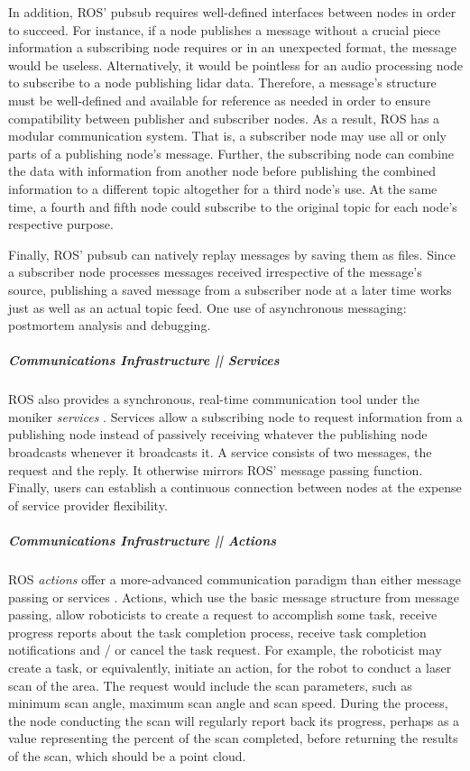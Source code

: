 \documentclass[9pt,twocolumn,twoside]{../../styles/osajnl}
\begin{document}
In addition, ROS' pubsub requires well-defined interfaces between nodes in order to succeed.  For instance, if a node publishes a message without a crucial piece information a subscribing node requires or in an unexpected format, the message would be useless.  Alternatively, it would be pointless for an audio processing node to subscribe to a node publishing lidar data.  Therefore, a message's structure must be well-defined and available for reference as needed in order to ensure compatibility between publisher and subscriber nodes.  As a result, ROS has a modular communication system.  That is, a subscriber node may use all or only parts of a publishing node's message.  Further, the subscribing node can combine the data with information from another node before publishing the combined information to a different topic altogether for a third node's use.  At the same time, a fourth and fifth node could subscribe to the original topic for each node's respective purpose.  

Finally, ROS' pubsub can natively replay messages by saving them as files.  Since a subscriber node processes messages received irrespective of the message's source, publishing a saved message from a subscriber node at a later time works just as well as an actual topic feed.  One use of asynchronous messaging: postmortem analysis and debugging.

\subparagraph{Communications Infrastructure || Services}
ROS also provides a synchronous, real-time communication tool under the moniker \textit{services} \cite{www-ros-services}. Services allow a subscribing node to request information from a publishing node instead of passively receiving whatever the publishing node broadcasts whenever it broadcasts it.  A service consists of two messages, the request and the reply.  It otherwise mirrors ROS' message passing function.  Finally, users can establish a continuous connection between nodes at the expense of service provider flexibility.

\subparagraph{Communications Infrastructure || Actions}
ROS \textit{actions} offer a more-advanced communication paradigm than either message passing or services \cite{www-ros-actionlib}.  Actions, which use the basic message structure from message passing, allow roboticists to create a request to accomplish some task, receive progress reports about the task completion process, receive task completion notifications and / or cancel the task request.  For example, the roboticist may create a task, or equivalently, initiate an action, for the robot to conduct a laser scan of the area.  The request would include the scan parameters, such as minimum scan angle, maximum scan angle and scan speed.  During the process, the node conducting the scan will regularly report back its progress, perhaps as a value representing the percent of the scan completed, before returning the results of the scan, which should be a point cloud.
\end{document}
